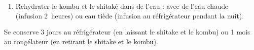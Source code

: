 \label{精進だし}

\begin{ingredients}
\end{ingredients}


\begin{recipe}
  \begin{enumerate}

  \item Rehydrater le kombu et le shitaké dans de l'eau : avec de
    l'eau chaude (infusion 2~heures) ou eau tiède (infusion au
    réfrigérateur pendant la nuit).

  \end{enumerate}
\end{recipe}

Se conserve 3 jours au réfrigérateur (en laissant le shitake et le
kombu) ou 1 mois au congélateur (en retirant le shitake et le kombu).

